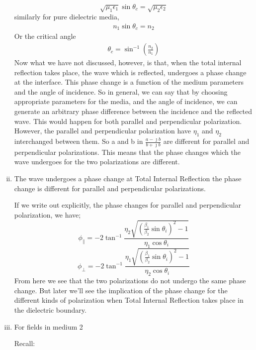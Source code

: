 \begin{enumerate}[(i)]
\begin{equation*}
\sqrt{\mu_1\epsilon_1} \sin\theta_c = \sqrt{\mu_2\epsilon_2}
\end{equation*}
similarly for pure dielectric media, 
\begin{align*}
n_1 \sin\theta_c = n_2
\end{align*}
Or the critical angle
\begin{align*}
\theta_c = \sin^{-1}(\frac{n_2}{n_1}) 
\end{align*}
Now what we have not discussed, however, is that, when the total internal reflection takes place, the wave which is reflected, undergoes a phase change at the interface. This phase change is a function of the medium parameters and the angle of incidence. So in general, we can say that by choosing appropriate parameters for the media, and the angle of incidence, we can generate an arbitrary phase difference between the incidence and the reflected wave. This would happen for both parallel and perpendicular polarization. However, the parallel and perpendicular polarization have $\eta_1$ and $\eta_2$
interchanged between them. So a and b in $\frac{a - \jmath b}{b + \jmath b}$ are different for parallel and perpendicular polarizations. This means that the phase changes which the wave undergoes for the two polarizations are different.

\item The wave undergoes a phase change at Total Internal Reflection the phase change is different for parallel and perpendicular polarizations.

If we write out explicitly, the phase changes for parallel and perpendicular polarization, we have;
\begin{equation}
\phi_\parallel = -2\tan^{-1}\frac{\eta_2\sqrt{(\frac{\beta_1}{\beta_2}\sin\theta_i)^2-1}}{\eta_1\cos\theta_i}
\end{equation}
\begin{equation}
\phi_\perp = -2\tan^{-1}\frac{\eta_1\sqrt{(\frac{\beta_1}{\beta_2}\sin\theta_i)^2-1}}{\eta_2\cos\theta_i}
\end{equation}
From here we see that the two polarizations do not undergo the same phase change. But later we'll see the implication of the phase change for the different kinds of polarization when Total Internal Reflection takes place in the dielectric boundary. 

\item For fields in medium 2

Recall:


\end{enumerate}
